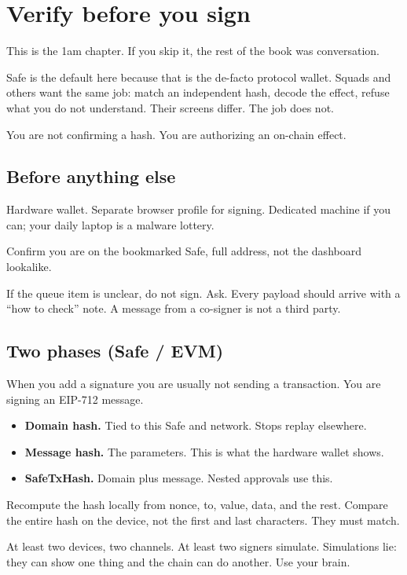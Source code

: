 \chapter{Verify before you sign}

This is the 1am chapter. If you skip it, the rest
of the book was conversation.

Safe is the default here because that is the
de-facto protocol wallet. Squads and others want
the same job: match an independent hash, decode
the effect, refuse what you do not understand.
Their screens differ. The job does not.

You are not confirming a hash. You are authorizing
an on-chain effect.

\section{Before anything else}

Hardware wallet. Separate browser profile for
signing. Dedicated machine if you can; your daily
laptop is a malware lottery.

Confirm you are on the bookmarked Safe, full
address, not the dashboard lookalike.

If the queue item is unclear, do not sign. Ask.
Every payload should arrive with a ``how to check''
note. A message from a co-signer is not a third
party.

\section{Two phases (Safe / EVM)}

When you add a signature you are usually not
sending a transaction. You are signing an EIP-712
message.

\begin{itemize}
  \item \textbf{Domain hash.} Tied to this Safe
  and network. Stops replay elsewhere.
  \item \textbf{Message hash.} The parameters.
  This is what the hardware wallet shows.
  \item \textbf{SafeTxHash.} Domain plus message.
  Nested approvals use this.
\end{itemize}

Recompute the hash locally from nonce, to, value,
data, and the rest. Compare the entire hash on the
device, not the first and last characters. They
must match.

At least two devices, two channels. At least two
signers simulate. Simulations lie: they can show
one thing and the chain can do another. Use your
brain.

